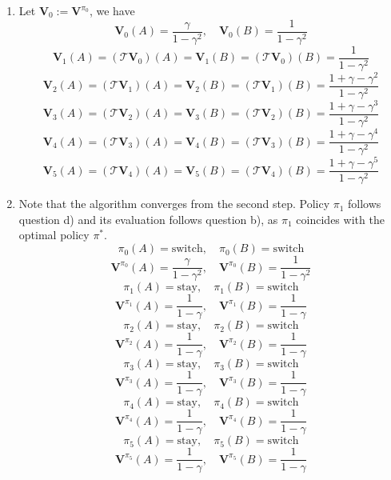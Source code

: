 \begin{Solution}
\begin{enumerate} [label=\alph*)]
$$\begin{aligned}
        & = \text{stay}
        \end{aligned}
        $$
        And
        $$
        \begin{aligned}
        \pi_1(B) & = \argmax_{a \in \mathcal{A}} \left [ r(B, a) + \gamma \sum_{s' \in \mathcal{S}} P(s' \mid B, a) \mathbf{V}^{\pi_0}(s') \right ] \\
        & = \text{switch}
        \end{aligned}
        $$
        \item
        Let $\mathbf{V}_0 := \mathbf{V}^{\pi_0}$, we have
        $$
        \mathbf{V}_0(A) = \dfrac{\gamma}{1 - \gamma^2}, \quad \mathbf{V}_0(B) = \dfrac{1}{1 - \gamma^2}
        $$
        $$
        \mathbf{V}_1(A) = (\mathcal{T}\mathbf{V}_0)(A) = \mathbf{V}_1(B) = (\mathcal{T}\mathbf{V}_0)(B) = \dfrac{1}{1 - \gamma^2}
        $$
        $$
        \mathbf{V}_2(A) = (\mathcal{T}\mathbf{V}_1)(A) = \mathbf{V}_2(B) = (\mathcal{T}\mathbf{V}_1)(B) = \dfrac{1 +\gamma - \gamma^2}{1 - \gamma^2}
        $$
        $$
        \mathbf{V}_3(A) = (\mathcal{T}\mathbf{V}_2)(A) = \mathbf{V}_3(B) = (\mathcal{T}\mathbf{V}_2)(B) = \dfrac{1 + \gamma - \gamma^3}{1 - \gamma^2}
        $$
        $$
        \mathbf{V}_4(A) = (\mathcal{T}\mathbf{V}_3)(A) = \mathbf{V}_4(B) = (\mathcal{T}\mathbf{V}_3)(B) = \dfrac{1 + \gamma - \gamma^4}{1 - \gamma^2}
        $$
        $$
        \mathbf{V}_5(A) = (\mathcal{T}\mathbf{V}_4)(A) = \mathbf{V}_5(B) = (\mathcal{T}\mathbf{V}_4)(B) = \dfrac{1 + \gamma - \gamma^5}{1 - \gamma^2}
        $$
        \item
        Note that the algorithm converges from the second step. Policy $\pi_1$ follows question d) and its evaluation follows question b), as $\pi_1$ coincides with the optimal policy $\pi^*$.
        $$
        \pi_0(A) = \text{switch}, \quad \pi_0(B) = \text{switch}
        $$
        $$
        \textbf{V}^{\pi_0}(A) = \dfrac{\gamma}{1 - \gamma^2}, \quad \textbf{V}^{\pi_0}(B) = \dfrac{1}{1 - \gamma^2}
        $$
        $$
        \pi_1(A) = \text{stay}, \quad \pi_1(B) = \text{switch}
        $$
        $$
        \textbf{V}^{\pi_1}(A) = \dfrac{1}{1 - \gamma}, \quad \textbf{V}^{\pi_1}(B) = \dfrac{1}{1 - \gamma}
        $$
        $$
        \pi_2(A) = \text{stay}, \quad \pi_2(B) = \text{switch}
        $$
        $$
        \textbf{V}^{\pi_2}(A) = \dfrac{1}{1 - \gamma}, \quad \textbf{V}^{\pi_2}(B) = \dfrac{1}{1 - \gamma}
        $$
        $$
        \pi_3(A) = \text{stay}, \quad \pi_3(B) = \text{switch}
        $$
        $$
        \textbf{V}^{\pi_3}(A) = \dfrac{1}{1 - \gamma}, \quad \textbf{V}^{\pi_3}(B) = \dfrac{1}{1 - \gamma}
        $$
        $$
        \pi_4(A) = \text{stay}, \quad \pi_4(B) = \text{switch}
        $$
        $$
        \textbf{V}^{\pi_4}(A) = \dfrac{1}{1 - \gamma}, \quad \textbf{V}^{\pi_4}(B) = \dfrac{1}{1 - \gamma}
        $$
        $$
        \pi_5(A) = \text{stay}, \quad \pi_5(B) = \text{switch}
        $$
        $$
        \textbf{V}^{\pi_5}(A) = \dfrac{1}{1 - \gamma}, \quad \textbf{V}^{\pi_5}(B) = \dfrac{1}{1 - \gamma}
        $$
    \end{enumerate}

\end{Solution}

